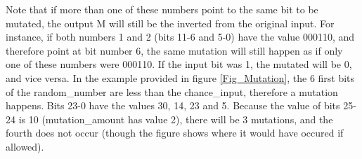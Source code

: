 Note that if more than one of these numbers point to the same bit to be mutated, the output M will still be the inverted from the original input. For instance, if both numbers 1 and 2 (bits 11-6 and 5-0) have the value 000110, and therefore point at bit number 6, the same mutation will still happen as if only one of these numbers were 000110. If the input bit was 1, the mutated will be 0, and vice versa.
In the example provided in figure \ref{Fig_Mutation}, the 6 first bits of the random\_number are less than the chance\_input, therefore a mutation happens. Bits 23-0 have the values 30, 14, 23 and 5. Because the value of bits 25-24 is 10 (mutation\_amount has value 2), there will be 3 mutations, and the fourth does not occur (though the figure shows where it would have occured if allowed).